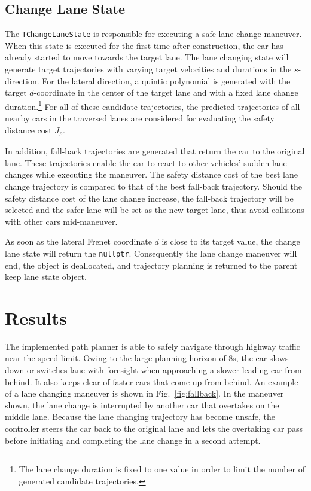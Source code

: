\documentclass[twoside]{article}
\newcommand{\code}[1]{{\texttt{#1}}}
\newcommand{\figref}[1]{Fig.~\ref{fig:#1}}
\begin{document}
\subsection{Change Lane State}
The \code{TChangeLaneState} is responsible for executing a safe lane change maneuver. When this
state is executed for the first time after construction, the car has already started to move
towards the target lane. The lane changing state will generate target trajectories with varying
target velocities and durations in the $s$-direction. For the lateral direction, a quintic polynomial is generated with the target $d$-coordinate in the center of the target lane and with a fixed lane change duration.\hspace{-0.08em}\footnote{The lane change duration is fixed to one
value in order to limit the number of generated candidate trajectories.} For all of these candidate trajectories, the predicted trajectories of all nearby
cars in the traversed lanes are considered for evaluating the safety distance cost $J_\rho$.

In addition, fall-back trajectories are generated that return the car to the original lane.
These trajectories enable the car to react to other vehicles' sudden
lane changes while executing the maneuver. The safety distance cost of the best lane
change trajectory is compared to that of the best fall-back trajectory. Should the safety
distance cost of the lane change increase, the fall-back trajectory will be selected and the
safer lane will be set as the new target lane, thus avoid collisions with other cars mid-maneuver.

As soon as the lateral Frenet coordinate $d$ is close to its target value, the change lane state
will return the \code{nullptr}. Consequently the lane change maneuver will end, the object is
deallocated, and trajectory planning is returned to the parent keep lane state object.

\section{Results}
The implemented path planner is able to safely navigate through highway traffic near the speed
limit. Owing to the large planning horizon of 8s, the car slows down or switches lane with
foresight when approaching a slower leading car from behind. It also keeps clear of faster
cars that come up from behind. An example of a lane changing maneuver is shown in \figref{fallback}. In the maneuver shown, the lane change is interrupted by another car that
overtakes on the middle lane. Because the lane changing trajectory has become unsafe, the
controller steers the car back to the original lane and lets the overtaking car pass before
initiating and completing the lane change in a second attempt.
\end{document}
